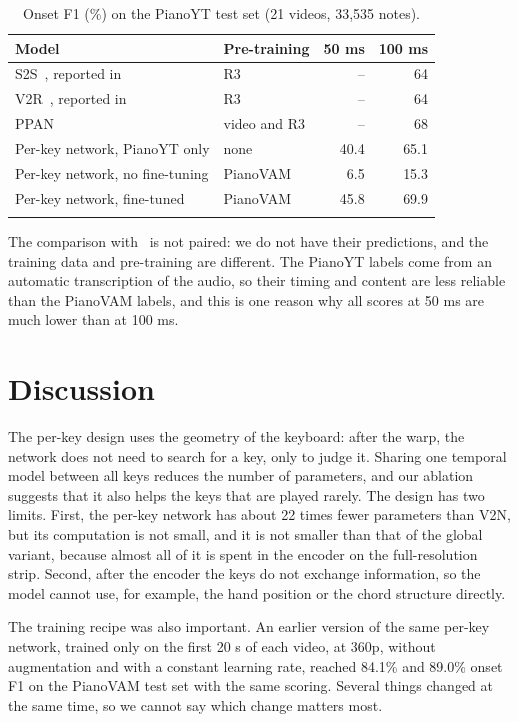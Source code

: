 \documentclass[pdflatex,sn-mathphys-num]{sn-jnl}
\begin{document}
\begin{table}[h]
\caption{Onset F1 (\%) on the PianoYT test set (21 videos, 33,535 notes).}\label{tab:yt}
\begin{tabular}{@{}llrr@{}}
\toprule
Model & Pre-training & 50 ms & 100 ms \\
\midrule
S2S~\cite{koepke2020}, reported in~\cite{zivanovic2025} & R3 & -- & 64 \\
V2R~\cite{su2020}, reported in~\cite{zivanovic2025} & R3 & -- & 64 \\
PPAN~\cite{zivanovic2025} & video and R3 & -- & 68 \\
\midrule
Per-key network, PianoYT only & none & 40.4 & 65.1 \\
Per-key network, no fine-tuning & PianoVAM & 6.5 & 15.3 \\
Per-key network, fine-tuned & PianoVAM & 45.8 & 69.9 \\
\botrule
\end{tabular}
\end{table}

The comparison with~\cite{zivanovic2025} is not paired: we do not have their predictions, and the training data and pre-training are different. The PianoYT labels come from an automatic transcription of the audio, so their timing and content are less reliable than the PianoVAM labels, and this is one reason why all scores at 50 ms are much lower than at 100 ms.

\section{Discussion}\label{sec:discussion}

The per-key design uses the geometry of the keyboard: after the warp, the network does not need to search for a key, only to judge it. Sharing one temporal model between all keys reduces the number of parameters, and our ablation suggests that it also helps the keys that are played rarely. The design has two limits. First, the per-key network has about 22 times fewer parameters than V2N, but its computation is not small, and it is not smaller than that of the global variant, because almost all of it is spent in the encoder on the full-resolution strip. Second, after the encoder the keys do not exchange information, so the model cannot use, for example, the hand position or the chord structure directly.

The training recipe was also important. An earlier version of the same per-key network, trained only on the first 20 s of each video, at 360p, without augmentation and with a constant learning rate, reached 84.1\% and 89.0\% onset F1 on the PianoVAM test set with the same scoring. Several things changed at the same time, so we cannot say which change matters most.
\end{document}

